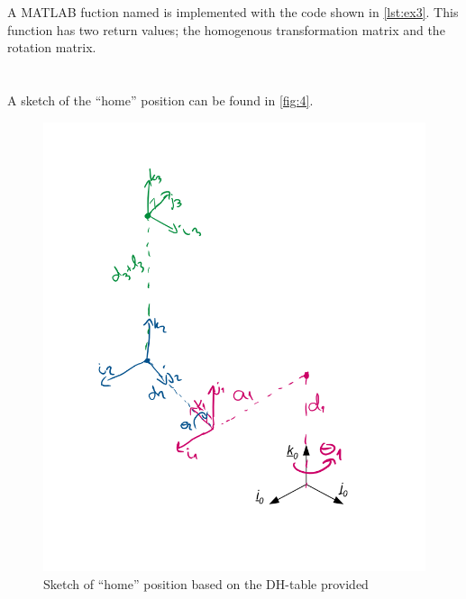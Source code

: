 \documentclass[a4paper]{scrartcl}
\begin{document}
\section{}
A MATLAB fuction named  is implemented with the code shown in \autoref{lst:ex3}. This function has two return values; the homogenous transformation matrix and the rotation matrix. 


\section{}
A sketch of the ``home'' position can be found in \autoref{fig:4}.

\begin{figure}[h!]
    \centering
    \includegraphics[width = .95\textwidth]{4.PNG}
    \caption{Sketch of ``home'' position based on the DH-table provided}
    \label{fig:4}
\end{figure}
\end{document}
